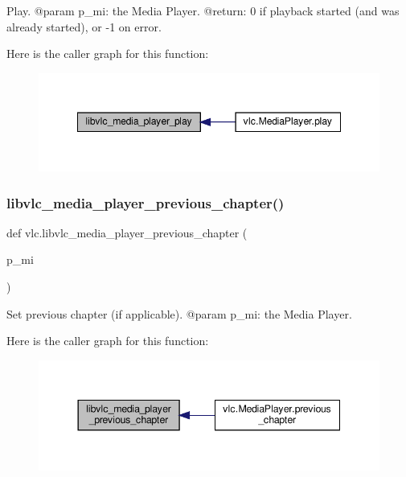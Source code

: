 \begin{DoxyVerb}Play.
@param p_mi: the Media Player.
@return: 0 if playback started (and was already started), or -1 on error.
\end{DoxyVerb}
 Here is the caller graph for this function\+:
\nopagebreak
\begin{figure}[H]
\begin{center}
\leavevmode
\includegraphics[width=348pt]{namespacevlc_a17af4b7be817987cbc47625092cb49f3_icgraph}
\end{center}
\end{figure}
\mbox{\label{namespacevlc_abec40b98a43df9c42c55c24dbfb08b67}} 
\subsubsection{\texorpdfstring{libvlc\+\_\+media\+\_\+player\+\_\+previous\+\_\+chapter()}{libvlc\_media\_player\_previous\_chapter()}}
{\footnotesize\ttfamily def vlc.\+libvlc\+\_\+media\+\_\+player\+\_\+previous\+\_\+chapter (\begin{DoxyParamCaption}\item[{}]{p\+\_\+mi }\end{DoxyParamCaption})}

\begin{DoxyVerb}Set previous chapter (if applicable).
@param p_mi: the Media Player.
\end{DoxyVerb}
 Here is the caller graph for this function\+:
\nopagebreak
\begin{figure}[H]
\begin{center}
\leavevmode
\includegraphics[width=344pt]{namespacevlc_abec40b98a43df9c42c55c24dbfb08b67_icgraph}
\end{center}
\end{figure}
\mbox{\label{namespacevlc_a17e9b0dc6a8244a4c018d79adb86095a}} 
